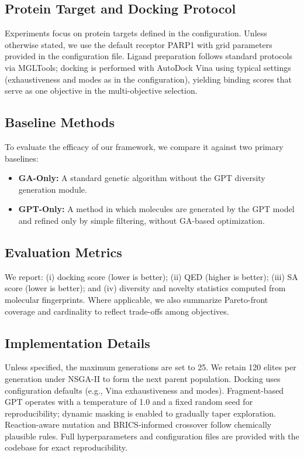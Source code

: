 \documentclass[letterpaper,journal]{IEEEtran}
\begin{document}
\subsection{Protein Target and Docking Protocol}
Experiments focus on protein targets defined in the configuration. Unless otherwise stated, we use the default receptor PARP1 with grid parameters provided in the configuration file. Ligand preparation follows standard protocols via MGLTools; docking is performed with AutoDock Vina using typical settings (exhaustiveness and modes as in the configuration), yielding binding scores that serve as one objective in the multi-objective selection.
\subsection{Baseline Methods}
To evaluate the efficacy of our framework, we compare it against two primary baselines:
\begin{itemize}
    \item \textbf{GA-Only:} A standard genetic algorithm without the GPT diversity generation module.
    \item \textbf{GPT-Only:} A method in which molecules are generated by the GPT model and refined only by simple filtering, without GA-based optimization.
\end{itemize}
\subsection{Evaluation Metrics}
We report: (i) docking score (lower is better); (ii) QED (higher is better); (iii) SA score (lower is better); and (iv) diversity and novelty statistics computed from molecular fingerprints. Where applicable, we also summarize Pareto-front coverage and cardinality to reflect trade-offs among objectives.
\subsection{Implementation Details}
Unless specified, the maximum generations are set to 25. We retain 120 elites per generation under NSGA-II to form the next parent population. Docking uses configuration defaults (e.g., Vina exhaustiveness and modes). Fragment-based GPT operates with a temperature of 1.0 and a fixed random seed for reproducibility; dynamic masking is enabled to gradually taper exploration. Reaction-aware mutation and BRICS-informed crossover follow chemically plausible rules. Full hyperparameters and configuration files are provided with the codebase for exact reproducibility.
\end{document}
